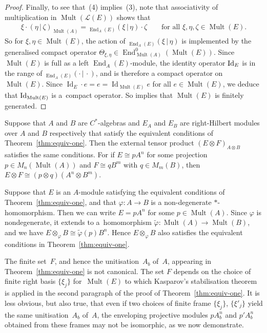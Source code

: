 \documentclass[pdftex]{sigma}
\numberwithin{equation}{section}
\DeclareMathOperator{\End}{End} %
\DeclareMathOperator{\Id}{Id} %
\DeclareMathOperator{\Mult}{Mult} %
\renewcommand{\L}{\mathcal{L}}
\newcommand{\ox}{\otimes} %
\begin{document}
\begin{proof}
Finally, to see that~(4) implies~(3), note that associativity of multiplication in $\Mult(\L(E))$ shows that
\begin{gather*}
\xi \cdot (\eta \,|\, \zeta)_{\Mult(A)} = {_{\End_A(E)}(\xi \,|\, \eta)\cdot\zeta} \qquad\text{for all $\xi,\eta,\zeta \in \Mult(E)$.}
\end{gather*}
So for $\xi,\eta \in \Mult(E)$, the action of ${_{\End_A(E)}(\xi \,|\, \eta)}$ is implemented by the generalised compact operator $\Theta_{\xi, \eta} \in \End^0_{\Mult(A)}(\Mult(E))$. Since $\Mult(E)$ is full as a left $\End_A(E)$-module, the identity operator ${\rm Id}_E$ is in the range of ${_{\End_A(E)}(\cdot \,|\, \cdot)}$, and is therefore a compact operator on~$\Mult(E)$. Since $\Id_E \cdot e = e = \Id_{\Mult(E)} e$ for all $e \in \Mult(E)$, we deduce that ${\rm Id}_{\Mult(E)}$ is a~compact operator. So \cite[Theorem~8.1.27]{BleM} implies that $\Mult(E)$ is f\/initely generated.
\end{proof}

\begin{rmk} Suppose that $A$ and $B$ are $C^*$-algebras and $E_A$ and $E_B$ are right-Hilbert modules over $A$ and $B$ respectively that satisfy the equivalent conditions of Theorem~\ref{thm:equiv-one}. Then the external tensor product $(E\ox F)_{A\ox B}$ satisf\/ies the same conditions. For if $E\cong pA^n$ for some projection $p\in M_n(\Mult(A))$ and $F\cong qB^m$ with $q\in M_m(B)$, then $E\ox F\cong (p\ox q)(A^n\ox B^m)$.
\end{rmk}

\begin{rmk} Suppose that $E$ is an $A$-module satisfying the equivalent conditions of Theo\-rem~\ref{thm:equiv-one}, and that $\varphi \colon A \to B$ is a non-degenerate $*$-homomorphism. Then we can write $E = p A^n$ for some $p \in \Mult(A)$. Since $\varphi$ is nondegenerate, it extends to a~homomorphism $\tilde\varphi \colon \Mult(A) \to \Mult(B)$, and we have $E\ox_{\varphi}B\cong \tilde\varphi(p)B^n$. Hence $E\ox_{\varphi}B$ also satisf\/ies the equivalent conditions in Theorem~\ref{thm:equiv-one}.
\end{rmk}

The f\/inite set~$F$, and hence the unitisation~$A_b$ of~$A$, appearing in Theorem~\ref{thm:equiv-one} is not canonical. The set $F$ depends on the choice of f\/inite right basis $\{\xi_j\}$ for~$\Mult(E)$ to which Kasparov's stabilisation theorem is applied in the second paragraph of the proof of Theorem~\ref{thm:equiv-one}. It is less obvious, but also true, that even if two choices of f\/inite frame $\{\xi_j\}$, $\{\xi'_j\}$ yield the same unitisation~$A_b$ of~$A$, the enveloping projective modules $p A_b^n$ and $p'A_b^n$ obtained from these frames may not be isomorphic, as we now
demonstrate.
\end{document}
